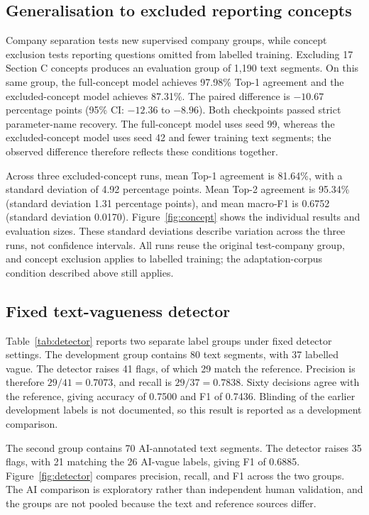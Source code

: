 

\subsection{Generalisation to excluded reporting concepts}
\label{sec:concept_diagnostics}

Company separation tests new supervised company groups, while concept exclusion tests reporting questions omitted from labelled training. Excluding 17 Section C concepts produces an evaluation group of 1,190 text segments. On this same group, the full-concept model achieves 97.98\% Top-1 agreement and the excluded-concept model achieves 87.31\%. The paired difference is $-10.67$ percentage points (95\% CI: $-12.36$ to $-8.96$). Both checkpoints passed strict parameter-name recovery. The full-concept model uses seed 99, whereas the excluded-concept model uses seed 42 and fewer training text segments; the observed difference therefore reflects these conditions together.

Across three excluded-concept runs, mean Top-1 agreement is 81.64\%, with a standard deviation of 4.92 percentage points. Mean Top-2 agreement is 95.34\% (standard deviation 1.31 percentage points), and mean macro-F1 is 0.6752 (standard deviation 0.0170). Figure~\ref{fig:concept} shows the individual results and evaluation sizes. These standard deviations describe variation across the three runs, not confidence intervals. All runs reuse the original test-company group, and concept exclusion applies to labelled training; the adaptation-corpus condition described above still applies.



\subsection{Fixed text-vagueness detector}

Table~\ref{tab:detector} reports two separate label groups under fixed detector settings. The development group contains 80 text segments, with 37 labelled vague. The detector raises 41 flags, of which 29 match the reference. Precision is therefore $29/41=0.7073$, and recall is $29/37=0.7838$. Sixty decisions agree with the reference, giving accuracy of 0.7500 and F1 of 0.7436. Blinding of the earlier development labels is not documented, so this result is reported as a development comparison.

The second group contains 70 AI-annotated text segments. The detector raises 35 flags, with 21 matching the 26 AI-vague labels, giving F1 of 0.6885. Figure~\ref{fig:detector} compares precision, recall, and F1 across the two groups. The AI comparison is exploratory rather than independent human validation, and the groups are not pooled because the text and reference sources differ.

